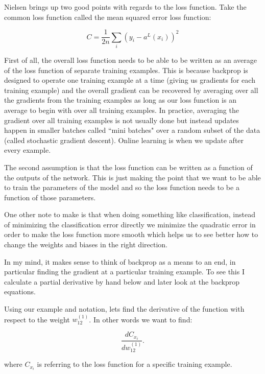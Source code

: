 Nielsen brings up two good points with regards to the loss function. Take the common loss function called the mean squared error loss function:

\begin{equation}
C = \frac{1}{2n} \sum_i (y_i - a^{L}(x_i))^2
\end{equation}

First of all, the overall loss function needs to be able to be written as an average of the loss function of separate training examples. This is because backprop is designed to operate one training example at a time (giving us gradients for each training example) and the overall gradient can be recovered by averaging over all the gradients from the training examples as long as our loss function is an average to begin with over all training examples. In practice, averaging the gradient over all training examples is not usually done but instead updates happen in smaller batches called ``mini batches" over a random subset of the data (called stochastic gradient descent). Online learning is when we update after every example.

The second assumption is that the loss function can be written as a function of the outputs of the network. This is just making the point that we want to be able to train the parameters of the model and so the loss function needs to be a function of those parameters.
 
One other note to make is that when doing something like classification, instead of minimizing the classification error directly we minimize the quadratic error in order to make the loss function more smooth which helps us to see better how to change the weights and biases in the right direction.
 
In my mind, it makes sense to think of backprop as a means to an end, in particular finding the gradient at a particular training example. To see this I calculate a partial derivative by hand below and later look at the backprop equations.

 Using our example and notation, lets find the derivative of the function with respect to the weight $w^{(1)}_{12}$. In other words we want to find:
 
 \begin{equation}
\frac{dC_{x_i}}{dw^{(1)}_{12}}.
 \end{equation}
 
\noindent where $C_{x_i}$ is referring to the loss function for a specific training example.
 

